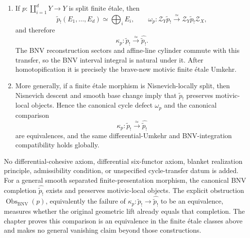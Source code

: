 \begin{theorem}
\begin{enumerate}
\item If \(p:\coprod_{i=1}^dY\to Y\) is split finite \'etale, then
\[
  \widetilde p_!(E_1,\ldots,E_d)
  \simeq
  \bigoplus_iE_i,
  \qquad
  \omega_p:
  \mathcal Z_Y\widetilde p_!
  \xrightarrow{\simeq}
  \mathcal Z_Y\widetilde p_!\mathcal Z_X,
\]
and therefore
\[
  \kappa_p:
  \widetilde p_!
  \xrightarrow{\simeq}
  \widehat{\widetilde p_!}.
\]
The BNV reconstruction sectors and affine-line cylinder commute with this transfer, so the
BNV interval integral is natural under it.  After homotopification it is
precisely the brave-new motivic finite \'etale Umkehr.

\item More generally, if a finite \'etale morphism is Nisnevich-locally split,
then Nisnevich descent and smooth base change imply that
\(\widetilde p_!\) preserves motivic-local objects.  Hence
the canonical cycle defect \(\omega_p\) and the canonical comparison
\[
  \kappa_p:
  \widetilde p_!
  \xrightarrow{\simeq}
  \widehat{\widetilde p_!}
\]
are equivalences, and the same differential-Umkehr and BNV-integration
compatibility holds globally.
\end{enumerate}

No differential-cohesive axiom, differential six-functor axiom, blanket
realization principle, admissibility condition, or unspecified cycle-transfer
datum is added.  For a general smooth separated finite-presentation morphism,
the canonical BNV completion \(\widehat{\widetilde p_!}\) exists and preserves
motivic-local objects.  The explicit obstruction
\(\operatorname{Obs}_{\mathrm{BNV}}(p)\), equivalently the failure of
\(\kappa_p:\widetilde p_!\to\widehat{\widetilde p_!}\) to be an equivalence,
measures whether the original geometric lift already equals that completion.
The chapter proves this comparison is an equivalence in the finite \'etale
classes above and makes no general vanishing claim beyond those constructions.
\end{theorem}
